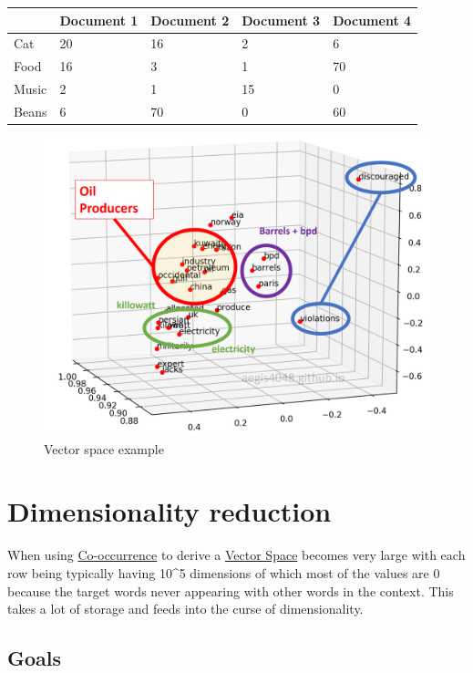 \documentclass[
  11pt,
  british,
]{article}
\begin{document}
\begin{longtable}[]{@{}lllll@{}}
\toprule
& Document 1 & Document 2 & Document 3 & Document 4 \\
\midrule
\endhead
Cat & 20 & 16 & 2 & 6 \\
Food & 16 & 3 & 1 & 70 \\
Music & 2 & 1 & 15 & 0 \\
Beans & 6 & 70 & 0 & 60 \\
\bottomrule
\end{longtable}

\begin{figure}
\centering
\includegraphics{Pasted_image_20220606221314.png}
\caption{Vector space example}
\end{figure}

\hypertarget{dimensionality-reduction}{%
\section{Dimensionality reduction}\label{dimensionality-reduction}}

When using \href{Co-occurrence.md}{Co-occurrence} to derive a
\href{Vector\%20Space.md}{Vector Space} becomes very large with each row
being typically having 10\^{}5 dimensions of which most of the values
are 0 because the target words never appearing with other words in the
context. This takes a lot of storage and feeds into the curse of
dimensionality.

\hypertarget{goals}{%
\subsection{Goals}\label{goals}}
\end{document}
